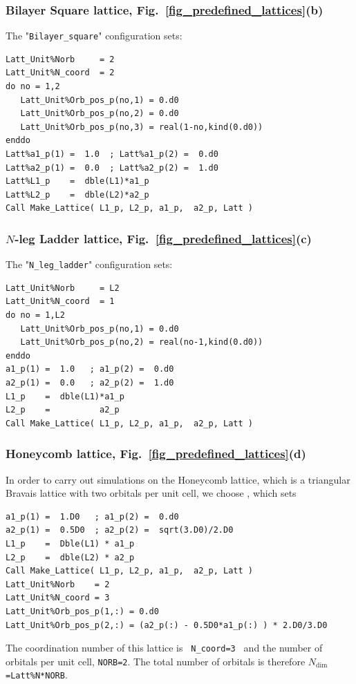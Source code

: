 \subsubsection{Bilayer Square lattice, Fig.~\ref{fig_predefined_lattices}(b)}
The "\texttt{Bilayer\_square}"   configuration sets:
\begin{lstlisting}[style=fortran]
Latt_Unit%Norb     = 2
Latt_Unit%N_coord  = 2
do no = 1,2
   Latt_Unit%Orb_pos_p(no,1) = 0.d0 
   Latt_Unit%Orb_pos_p(no,2) = 0.d0 
   Latt_Unit%Orb_pos_p(no,3) = real(1-no,kind(0.d0))
enddo
Latt%a1_p(1) =  1.0  ; Latt%a1_p(2) =  0.d0
Latt%a2_p(1) =  0.0  ; Latt%a2_p(2) =  1.d0
Latt%L1_p    =  dble(L1)*a1_p
Latt%L2_p    =  dble(L2)*a2_p
Call Make_Lattice( L1_p, L2_p, a1_p,  a2_p, Latt )
\end{lstlisting}

\subsubsection{$N$-leg Ladder lattice,  Fig.~\ref{fig_predefined_lattices}(c)}
The "\texttt{N\_leg\_ladder}"   configuration sets:
\begin{lstlisting}[style=fortran]
Latt_Unit%Norb     = L2
Latt_Unit%N_coord  = 1
do no = 1,L2
   Latt_Unit%Orb_pos_p(no,1) = 0.d0 
   Latt_Unit%Orb_pos_p(no,2) = real(no-1,kind(0.d0))
enddo
a1_p(1) =  1.0   ; a1_p(2) =  0.d0
a2_p(1) =  0.0   ; a2_p(2) =  1.d0
L1_p    =  dble(L1)*a1_p
L2_p    =          a2_p
Call Make_Lattice( L1_p, L2_p, a1_p,  a2_p, Latt )
\end{lstlisting}



\subsubsection{Honeycomb lattice, Fig.~\ref{fig_predefined_lattices}(d)}

In order to carry out simulations on the Honeycomb lattice, which is a triangular Bravais lattice with two orbitals per unit cell, we choose   , which sets
\begin{lstlisting}[style=fortran]
a1_p(1) =  1.D0   ; a1_p(2) =  0.d0
a2_p(1) =  0.5D0  ; a2_p(2) =  sqrt(3.D0)/2.D0
L1_p    =  Dble(L1) * a1_p
L2_p    =  dble(L2) * a2_p
Call Make_Lattice( L1_p, L2_p, a1_p,  a2_p, Latt )
Latt_Unit%Norb    = 2
Latt_Unit%N_coord = 3
Latt_Unit%Orb_pos_p(1,:) = 0.d0 
Latt_Unit%Orb_pos_p(2,:) = (a2_p(:) - 0.5D0*a1_p(:) ) * 2.D0/3.D0
\end{lstlisting}
The coordination number of this lattice is \texttt{ N\_coord=3 }  and  the number of orbitals per unit cell, \texttt{NORB=2}. The total number of orbitals is therefore \texttt{$N_{\mathrm{dim}}$=Latt\%N*NORB}.







